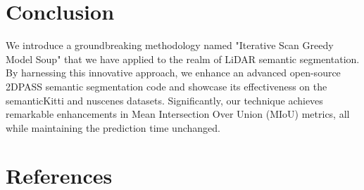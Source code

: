 \documentclass[10pt,twocolumn,letterpaper]{article}
\begin{document}
\section{Conclusion}

We introduce a groundbreaking methodology named "Iterative Scan Greedy Model Soup" that we have applied to the realm of LiDAR semantic segmentation. By harnessing this innovative approach, we enhance an advanced open-source 2DPASS \cite{yan20222dpass} semantic segmentation code and showcase its effectiveness on the semanticKitti and nuscenes datasets. Significantly, our technique achieves remarkable enhancements in Mean Intersection Over Union (MIoU) metrics, all while maintaining the prediction time unchanged.


\section{References}


\end{document}
